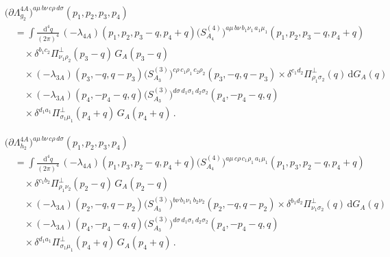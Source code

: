 \documentclass[11pt,a4paper]{article}
\begin{document}
\begin{align}
&\bigl(\partial\Lambda^{4A}_{g_2}\bigr)^{a\mu\,b\nu\,c\rho\,d\sigma}(p_1,p_2,p_3,p_4)
\nonumber\\
&\quad=
\int\frac{\mathrm{d}^4q}{(2\pi)^4}\,
(-\lambda_{4A})(p_1,p_2,p_3-q,p_4+q)
\bigl(S^{(4)}_{A_4}\bigr)^{a\mu\,b\nu\,b_1\nu_1\,a_1\mu_1}(p_1,p_2,p_3-q,p_4+q)
\nonumber\\
&\qquad\times
\delta^{b_1c_2}\Pi^\perp_{\nu_1\rho_2}(p_3-q)\,G_A(p_3-q)
\nonumber\\
&\qquad\times
(-\lambda_{3A})(p_3,-q,q-p_3)
\bigl(S^{(3)}_{A_3}\bigr)^{c\rho\,c_1\rho_1\,c_2\rho_2}(p_3,-q,q-p_3)
\times
\delta^{c_1d_2}\Pi^\perp_{\rho_1\sigma_2}(q)\,\mathrm{d}G_A(q)
\nonumber\\
&\qquad\times
(-\lambda_{3A})(p_4,-p_4-q,q)
\bigl(S^{(3)}_{A_3}\bigr)^{d\sigma\,d_1\sigma_1\,d_2\sigma_2}(p_4,-p_4-q,q)
\nonumber\\
&\qquad\times
\delta^{d_1a_1}\Pi^\perp_{\sigma_1\mu_1}(p_4+q)\,G_A(p_4+q)\,.
\label{eq:dLam-g2}
\end{align}

\begin{align}
&\bigl(\partial\Lambda^{4A}_{h_2}\bigr)^{a\mu\,b\nu\,c\rho\,d\sigma}(p_1,p_2,p_3,p_4)
\nonumber\\
&\quad=
\int\frac{\mathrm{d}^4q}{(2\pi)^4}\,
(-\lambda_{4A})(p_1,p_3,p_2-q,p_4+q)
\bigl(S^{(4)}_{A_4}\bigr)^{a\mu\,c\rho\,c_1\rho_1\,a_1\mu_1}(p_1,p_3,p_2-q,p_4+q)
\nonumber\\
&\qquad\times
\delta^{c_1b_2}\Pi^\perp_{\rho_1\nu_2}(p_2-q)\,G_A(p_2-q)
\nonumber\\
&\qquad\times
(-\lambda_{3A})(p_2,-q,q-p_2)
\bigl(S^{(3)}_{A_3}\bigr)^{b\nu\,b_1\nu_1\,b_2\nu_2}(p_2,-q,q-p_2)
\times
\delta^{b_1d_2}\Pi^\perp_{\nu_1\sigma_2}(q)\,\mathrm{d}G_A(q)
\nonumber\\
&\qquad\times
(-\lambda_{3A})(p_4,-p_4-q,q)
\bigl(S^{(3)}_{A_3}\bigr)^{d\sigma\,d_1\sigma_1\,d_2\sigma_2}(p_4,-p_4-q,q)
\nonumber\\
&\qquad\times
\delta^{d_1a_1}\Pi^\perp_{\sigma_1\mu_1}(p_4+q)\,G_A(p_4+q)\,.
\label{eq:dLam-h2}
\end{align}
\end{document}
